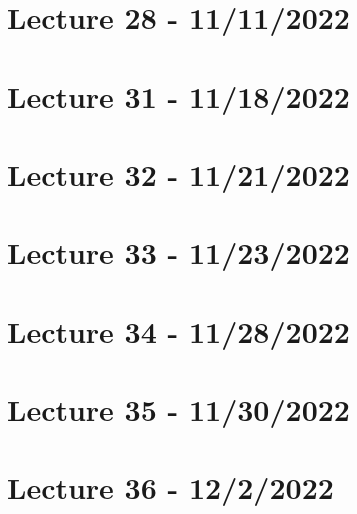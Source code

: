 \documentclass{article}
\begin{document}
\section{Lecture 28 - 11/11/2022}






\section{Lecture 31 - 11/18/2022}

\section{Lecture 32 - 11/21/2022}

\section{Lecture 33 - 11/23/2022}

\section{Lecture 34 - 11/28/2022}

\section{Lecture 35 - 11/30/2022}

\section{Lecture 36 - 12/2/2022}



\end{document}
